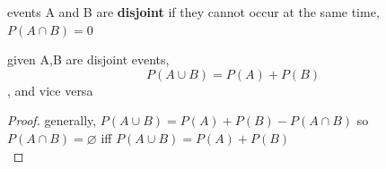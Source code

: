 \documentclass[a4paper,12pt]{article}
\newcommand{\?}{\stackrel{?}{=}}
\begin{document}
\newenvironment{note}
  {\begin{bclogo}[logo=\bcinfo, couleurBarre=orange, couleur=lightgray]{ note}}
  {\end{bclogo}}
\newenvironment{attention}
  {\begin{bclogo}[logo=\bcattention, couleurBarre=red, noborder=true, 
                couleur=red!15]{Important!}}
  {\end{bclogo}}

\begin{definition}
events A and B are \textbf{disjoint} if they cannot occur at the same time, \(P(A \cap B) = 0\)\\[0pt]
\begin{lemma}
given A,B are disjoint events, \[ P(A \cup B) = P(A) + P(B) \], and vice versa\\[0pt]
\begin{proof}
generally, \(P(A \cup B) = P(A)+P(B)-P(A \cap B)\) so \(P(A \cap B)=\varnothing\) iff \(P(A \cup B) = P(A)+P(B)\)\\[0pt]
\end{proof}
\end{lemma}
\end{definition}
\end{document}
